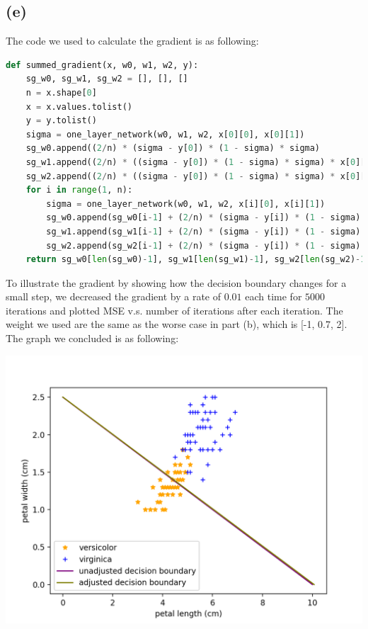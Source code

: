 \documentclass[12pt]{article}
\begin{document}
\subsection*{(e)}
The code we used to calculate the gradient is as following: 
\begin{lstlisting}[language=Python, caption=Calculate Gradient]
def summed_gradient(x, w0, w1, w2, y): 
    sg_w0, sg_w1, sg_w2 = [], [], []
    n = x.shape[0]
    x = x.values.tolist()
    y = y.tolist()
    sigma = one_layer_network(w0, w1, w2, x[0][0], x[0][1])
    sg_w0.append((2/n) * (sigma - y[0]) * (1 - sigma) * sigma)
    sg_w1.append((2/n) * ((sigma - y[0]) * (1 - sigma) * sigma) * x[0][0])
    sg_w2.append((2/n) * ((sigma - y[0]) * (1 - sigma) * sigma) * x[0][1])
    for i in range(1, n):
        sigma = one_layer_network(w0, w1, w2, x[i][0], x[i][1])
        sg_w0.append(sg_w0[i-1] + (2/n) * (sigma - y[i]) * (1 - sigma) * sigma)
        sg_w1.append(sg_w1[i-1] + (2/n) * (sigma - y[i]) * (1 - sigma) * sigma * x[i][0])
        sg_w2.append(sg_w2[i-1] + (2/n) * (sigma - y[i]) * (1 - sigma) * sigma * x [i][1])
    return sg_w0[len(sg_w0)-1], sg_w1[len(sg_w1)-1], sg_w2[len(sg_w2)-1]
\end{lstlisting}
To illustrate the gradient by showing how the decision boundary changes for a small step, we decreased the gradient by a rate of $0.01$ each time for 
$5000$ iterations and plotted MSE v.s. number of iterations after each iteration. The weight we used are the same as the worse case in part (b), which is [-1, 0.7, 2].
The graph we concluded is as following: 
\begin{center}
    \includegraphics[scale=0.6]{fig/p2e1.png}
\end{center}
\end{document}
